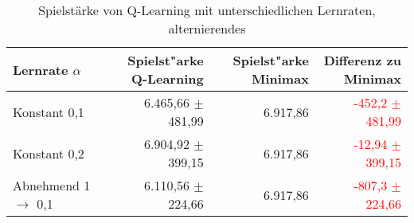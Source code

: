 \begin{table}
\centering
\caption[Spielstärke Q-Learning unterschiedliche Lernraten, alternierendes \splay]{Spielstärke von Q-Learning mit unterschiedlichen Lernraten, alternierendes \splay}
\label{tab:playingAbility_ql_alternate}

\begin{tabular}{lrrr}
\toprule
Lernrate $\alpha$ &  Spielst"arke Q-Learning & Spielst"arke Minimax & Differenz zu Minimax \\ \midrule
Konstant 0,1                    & 6.465,66 $\pm$ 481,99             & 6.917,86  & \textcolor{red}{-452,2 $\pm$ 481,99} \\
Konstant 0,2                    & 6.904,92 $\pm$ 399,15             & 6.917,86  & \textcolor{red}{-12,94 $\pm$ 399,15} \\
Abnehmend 1 $\rightarrow$ 0,1   & 6.110,56 $\pm$ 224,66             & 6.917,86  & \textcolor{red}{-807,3 $\pm$ 224,66} \\ \bottomrule

\end{tabular}
\end{table}